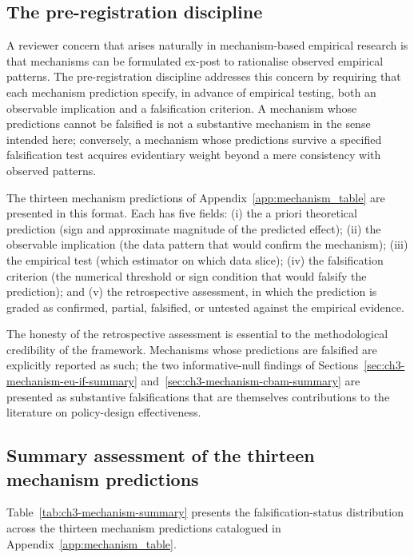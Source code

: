 \subsection{The pre-registration discipline}
\label{sec:ch3-prereg-discipline}

A reviewer concern that arises naturally in mechanism-based empirical research is that mechanisms can be formulated ex-post to rationalise observed empirical patterns. The pre-registration discipline addresses this concern by requiring that each mechanism prediction specify, in advance of empirical testing, both an observable implication and a falsification criterion. A mechanism whose predictions cannot be falsified is not a substantive mechanism in the sense intended here; conversely, a mechanism whose predictions survive a specified falsification test acquires evidentiary weight beyond a mere consistency with observed patterns.

The thirteen mechanism predictions of Appendix~\ref{app:mechanism_table} are presented in this format. Each has five fields: (i) the a priori theoretical prediction (sign and approximate magnitude of the predicted effect); (ii) the observable implication (the data pattern that would confirm the mechanism); (iii) the empirical test (which estimator on which data slice); (iv) the falsification criterion (the numerical threshold or sign condition that would falsify the prediction); and (v) the retrospective assessment, in which the prediction is graded as confirmed, partial, falsified, or untested against the empirical evidence.

The honesty of the retrospective assessment is essential to the methodological credibility of the framework. Mechanisms whose predictions are falsified are explicitly reported as such; the two informative-null findings of Sections~\ref{sec:ch3-mechanism-eu-if-summary} and~\ref{sec:ch3-mechanism-cbam-summary} are presented as substantive falsifications that are themselves contributions to the literature on policy-design effectiveness.

\subsection{Summary assessment of the thirteen mechanism predictions}
\label{sec:ch3-mechanism-summary}

Table~\ref{tab:ch3-mechanism-summary} presents the falsification-status distribution across the thirteen mechanism predictions catalogued in Appendix~\ref{app:mechanism_table}.

